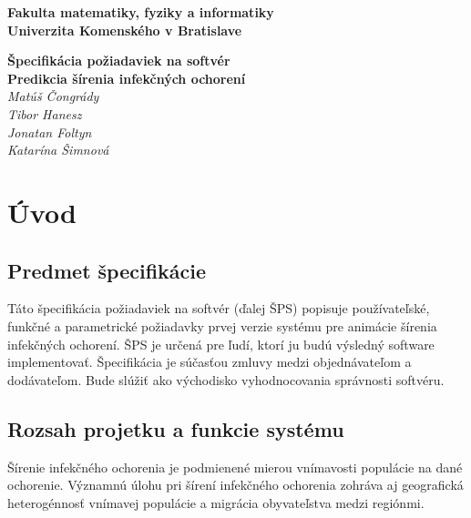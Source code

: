 \documentclass[12pt,a4paper]{report}
\begin{document}
\begin{titlepage}
\centering\bfseries
		Fakulta matematiky, fyziky a informatiky\\Univerzita Komenského v Bratislave	

	\fontsize{23}{28}\textbf{Špecifikácia požiadaviek na softvér}\\
	\fontsize{16}{22}\textbf{Predikcia šírenia infekčných ochorení}\\
	\large\textit{Matúš Čongrády\\Tibor Hanesz\\Jonatan Foltyn\\Katarína Šimnová}

\end{titlepage}\bigskip
	\setcounter{tocdepth}{9}
	\tableofcontents
	
\renewcommand{\chaptername}{}	
	\chapter[Úvod]{\rmfamily\bfseries
Úvod}


\section[Predmet špecifikácie]{\rmfamily\bfseries
	Predmet špecifikácie}
Táto špecifikácia požiadaviek na softvér (ďalej ŠPS) popisuje používateľské, funkčné a parametrické požiadavky prvej verzie systému pre animácie šírenia infekčných ochorení. ŠPS je určená pre ľudí, ktorí ju budú výsledný software implementovať. Špecifikácia je súčasťou zmluvy medzi objednávateľom a dodávateľom. Bude slúžiť ako východisko vyhodnocovania správnosti softvéru.

\section[Rozsah projetku a funkcie systému]{\rmfamily\bfseries
Rozsah projetku a funkcie systému}
Šírenie infekčného ochorenia je podmienené mierou vnímavosti populácie na dané ochorenie. Významnú úlohu pri šírení infekčného ochorenia zohráva aj geografická heterogénnosť vnímavej populácie a migrácia obyvateľstva medzi regiónmi.\par
\end{document}

